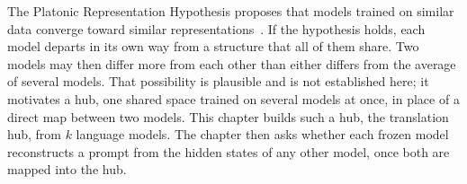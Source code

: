 The Platonic Representation Hypothesis proposes that models trained on similar data converge toward similar representations~\cite{huh2024platonic}.
If the hypothesis holds, each model departs in its own way from a structure that all of them share.
Two models may then differ more from each other than either differs from the average of several models.
That possibility is plausible and is not established here; it motivates a hub, one shared space trained on several models at once, in place of a direct map between two models.
This chapter builds such a hub, the translation hub, from $k$ language models.
The chapter then asks whether each frozen model reconstructs a prompt from the hidden states of any other model, once both are mapped into the hub.

